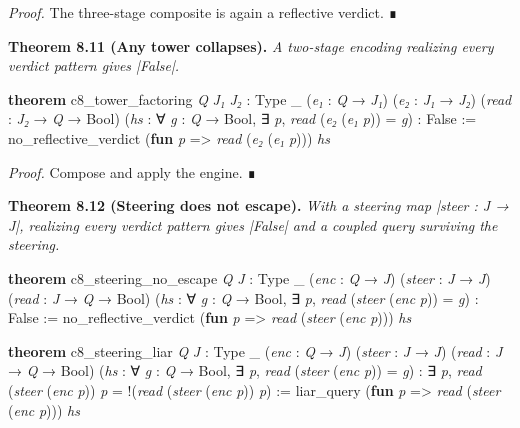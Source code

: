 \documentclass{memoir}
\begin{document}
\emph{Proof.} The three-stage composite is again a reflective verdict. ∎

\textbf{Theorem 8.11 (Any tower collapses).} \emph{A two-stage encoding realizing every verdict
pattern gives \LeanVerb|False|.}

\begin{LeanVerbatim}
\textbf{theorem} c8_tower_factoring \textit{Q} \textit{J₁} \textit{J₂} : Type _
    (\textit{e₁} : \textit{Q} → \textit{J₁}) (\textit{e₂} : \textit{J₁} → \textit{J₂}) (\textit{read} : \textit{J₂} → \textit{Q} → Bool)
    (\textit{hs} : ∀ \textit{g} : \textit{Q} → Bool, ∃ \textit{p}, \textit{read} (\textit{e₂} (\textit{e₁} \textit{p})) = \textit{g}) :
    False :=
  no_reflective_verdict (\textbf{fun} \textit{p} => \textit{read} (\textit{e₂} (\textit{e₁} \textit{p}))) \textit{hs}

\end{LeanVerbatim}


\emph{Proof.} Compose and apply the engine. ∎

\textbf{Theorem 8.12 (Steering does not escape).} \emph{With a steering map \LeanVerb|steer : J → J|,
realizing every verdict pattern gives \LeanVerb|False| and a coupled query surviving the
steering.}

\begin{LeanVerbatim}
\textbf{theorem} c8_steering_no_escape \textit{Q} \textit{J} : Type _
    (\textit{enc} : \textit{Q} → \textit{J}) (\textit{steer} : \textit{J} → \textit{J}) (\textit{read} : \textit{J} → \textit{Q} → Bool)
    (\textit{hs} : ∀ \textit{g} : \textit{Q} → Bool, ∃ \textit{p}, \textit{read} (\textit{steer} (\textit{enc} \textit{p})) = \textit{g}) :
    False :=
  no_reflective_verdict (\textbf{fun} \textit{p} => \textit{read} (\textit{steer} (\textit{enc} \textit{p}))) \textit{hs}

\textbf{theorem} c8_steering_liar \textit{Q} \textit{J} : Type _
    (\textit{enc} : \textit{Q} → \textit{J}) (\textit{steer} : \textit{J} → \textit{J}) (\textit{read} : \textit{J} → \textit{Q} → Bool)
    (\textit{hs} : ∀ \textit{g} : \textit{Q} → Bool, ∃ \textit{p}, \textit{read} (\textit{steer} (\textit{enc} \textit{p})) = \textit{g}) :
    ∃ \textit{p}, \textit{read}
    (\textit{steer} (\textit{enc} \textit{p})) \textit{p} = !(\textit{read} (\textit{steer} (\textit{enc} \textit{p})) \textit{p}) :=
  liar_query (\textbf{fun} \textit{p} => \textit{read} (\textit{steer} (\textit{enc} \textit{p}))) \textit{hs}

\end{LeanVerbatim}
\end{document}
